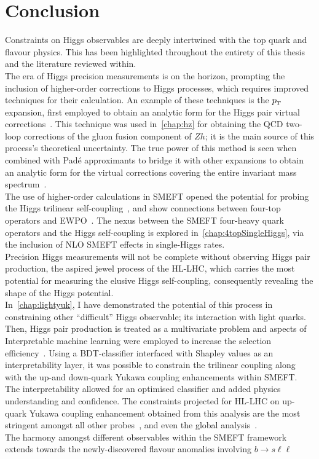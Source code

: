 \chapter{Conclusion}
Constraints on Higgs observables are deeply intertwined with the top quark and flavour physics. This has been highlighted throughout the entirety of this thesis and the literature reviewed within. \\  The era of Higgs precision measurements is on the horizon, prompting the inclusion of higher-order corrections to Higgs processes, which requires improved techniques for their calculation. An example of these techniques is the $p_{\scriptscriptstyle T}$ expansion, first employed to obtain an analytic form for the Higgs pair virtual corrections~\cite{Bonciani:2018omm}. This technique was used in~\autoref{chap:hz} for obtaining the QCD two-loop corrections of the gluon fusion component of $Zh$; it is the main source of this process's theoretical uncertainty. The true power of this method is seen when combined with Pad\'e approximants to bridge it with other expansions to obtain an analytic form for the virtual corrections covering the entire invariant mass spectrum~\cite{Bellafronte:2022jmo}. \\ The use of higher-order calculations in SMEFT opened the potential for probing the Higgs trilinear self-coupling~\cite{Gorbahn:2016uoy, Degrassi:2016wml, Bizon:2016wgr, Maltoni:2017ims, Degrassi:2021uik}, and show connections between four-top operators and EWPO~\cite{Dawson:2022bxd}. The nexus between the SMEFT four-heavy quark operators and the Higgs self-coupling is explored in~\autoref{chap:4topSingleHiggs}, via the inclusion of NLO SMEFT effects in single-Higgs rates. \\ Precision Higgs measurements will not be complete without observing Higgs pair production, the aspired jewel process of the HL-LHC, which carries the most potential for measuring the elusive Higgs self-coupling,  consequently revealing the shape of the Higgs potential.\\ In~\autoref{chap:lightyuk}, I have demonstrated the potential of this process in constraining other ``difficult'' Higgs observable; its interaction with light quarks. Then,  Higgs pair production is treated as a multivariate problem and aspects of Interpretable machine learning were employed to increase the selection efficiency~\cite{Grojean:2020ech}. Using a BDT-classifier interfaced with Shapley values as an interpretability layer, it was possible to constrain the trilinear coupling along with the up-and down-quark Yukawa coupling enhancements within SMEFT. The interpretability allowed for an optimised classifier and added physics understanding and confidence. The constraints projected for HL-LHC on up-quark Yukawa coupling enhancement obtained from this analysis are the most stringent amongst all other probes~\cite{Soreq:2016rae,Falkowski:2020znk,Aguilar-Saavedra:2020rgo,Yu:2017vul}, and even the global analysis~\cite{deBlas:2019rxi}.  \\ The harmony amongst different observables within the SMEFT framework extends towards the newly-discovered flavour anomalies involving $ b \to s \ell \ell$ 